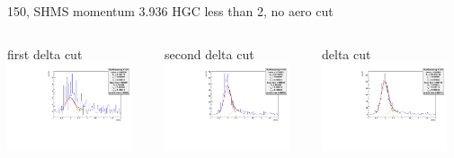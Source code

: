 \documentclass[aspectratio=169,xcolor=dvipsnames]{beamer}
\begin{document}
\begin{frame}{150, SHMS momentum 3.936}
HGC less than 2, no aero cut\\
\begin{columns}
\begin{column}[T]{0.33\textwidth}
first delta cut \\
\includegraphics[width = 0.9\textwidth]{results/pid/rftime/rftime_neg_150_0.pdf}
\end{column}
\begin{column}[T]{0.33\textwidth}
second delta cut \\
\includegraphics[width = 0.9\textwidth]{results/pid/rftime/rftime_neg_150_1.pdf}
\end{column}
\begin{column}[T]{0.33\textwidth}
delta cut \\
\includegraphics[width = 0.9\textwidth]{results/pid/rftime/rftime_neg_150_2.pdf}

\end{column}
\end{columns}
\end{frame}
\end{document}
